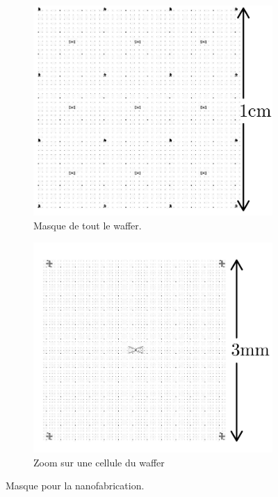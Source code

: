 \begin{figure}[h!]
    \centering
    \begin{subfigure}[b]{0.4\textwidth}
        \centering
        \includegraphics[width=0.8\linewidth]{texfigures/waffer.png}
        \caption{\label{fig:waffer} Masque de tout le waffer.}
    \end{subfigure}
    \begin{subfigure}[b]{0.4\textwidth}
        \centering
        \includegraphics[width=0.8\linewidth]{texfigures/waffer_cell.png}
        \caption{\label{fig:waffer_cell} Zoom sur une cellule du waffer}
    \end{subfigure}
    \caption{Masque pour la nanofabrication.}
\end{figure}

